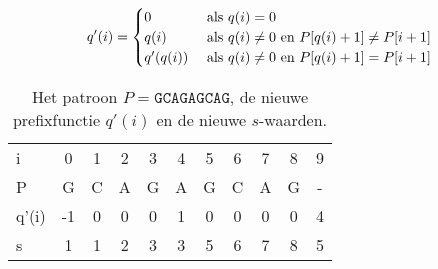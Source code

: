 \begin{itemize}
    $$q'(i) = \begin{cases}
        0 & \hbox{ als } q(i) = 0  \\
        q(i) & \hbox{ als } q(i) \neq 0 \hbox{ en } P[q(i) + 1] \neq P[i + 1] \\
        q'(q(i)) & \hbox{ als } q(i) \neq 0 \hbox{ en } P[q(i) + 1] = P[i + 1] \\
    \end{cases}$$
    \begin{table}[ht]
        \centering
        \begin{tabular}{l | c c c c c c c c c c}
            i   & 0 & 1 & 2 & 3 & 4 & 5 & 6 & 7 & 8 & 9\\
            P   & G & C & A & G & A & G & C & A & G & - \\
                \hline
            q'(i) & -1 & 0 & 0 & 0 & 1 & 0 & 0 & 0 & 0 & 4 \\
            s   & 1 & 1 & 2 & 3 & 3 & 5 & 6 & 7 & 8 & 5
        \end{tabular}
        \caption{Het patroon $P = \texttt{GCAGAGCAG}$, de nieuwe prefixfunctie $q'(i)$ en de nieuwe $s$-waarden.}
        \label{table:kmp2}
    \end{table}

    \begin{table}[ht]
        \centering   
        \caption{De tweede versie van het Knuth-Morris-Prattalgoritme, waarbij $s = i - q'(i)$.}
        \label{table:kmpex2}
    \end{table}

\end{itemize}


